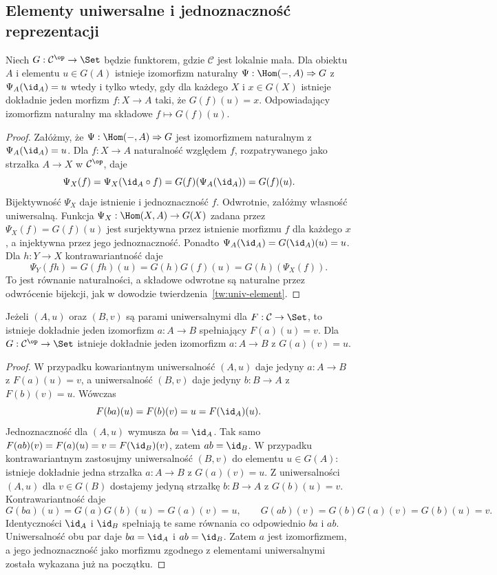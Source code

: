 \subsection{Elementy uniwersalne i jednoznaczność reprezentacji}

\begin{twierdzenie}\label{cat:thm:contra-univ-element}
Niech $G:\mathcal C^{\op}\to\Set$ będzie funktorem, gdzie $\mathcal C$ jest lokalnie mała. Dla obiektu $A$ i elementu $u\in G(A)$ istnieje izomorfizm naturalny $\Psi:\Hom(-,A)\Rightarrow G$ z $\Psi_A(\id_A)=u$ wtedy i tylko wtedy, gdy dla każdego $X$ i $x\in G(X)$ istnieje dokładnie jeden morfizm $f:X\to A$ taki, że $G(f)(u)=x$. Odpowiadający izomorfizm naturalny ma składowe $f\mapsto G(f)(u)$.
\end{twierdzenie}
\begin{proof}
Załóżmy, że $\Psi:\Hom(-,A)\Rightarrow G$ jest izomorfizmem naturalnym z $\Psi_A(\id_A)=u$. Dla $f:X\to A$ naturalność względem $f$, rozpatrywanego jako strzałka $A\to X$ w $\mathcal C^{\op}$, daje
\[
\Psi_X(f)=\Psi_X(\id_A\circ f)=G(f)(\Psi_A(\id_A))=G(f)(u).
\]
Bijektywność $\Psi_X$ daje istnienie i jednoznaczność $f$.
Odwrotnie, załóżmy własność uniwersalną. Funkcja
$\Psi_X:\Hom(X,A)\to G(X)$ zadana przez $\Psi_X(f)=G(f)(u)$
jest surjektywna przez istnienie morfizmu $f$ dla każdego $x$, a injektywna przez jego jednoznaczność. Ponadto $\Psi_A(\id_A)=G(\id_A)(u)=u$. Dla $h:Y\to X$ kontrawariantność daje
\[
\Psi_Y(fh)=G(fh)(u)=G(h)G(f)(u)=G(h)(\Psi_X(f)).
\]
To jest równanie naturalności, a składowe odwrotne są naturalne przez odwrócenie bijekcji, jak w dowodzie twierdzenia~\ref{tw:univ-element}.
\end{proof}

\begin{twierdzenie}\label{cat:thm:representing-unique}
Jeżeli $(A,u)$ oraz $(B,v)$ są parami uniwersalnymi dla $F:\mathcal C\to\Set$, to istnieje dokładnie jeden izomorfizm $a:A\to B$ spełniający $F(a)(u)=v$. Dla $G:\mathcal C^{\op}\to\Set$ istnieje dokładnie jeden izomorfizm $a:A\to B$ z $G(a)(v)=u$.
\end{twierdzenie}
\begin{proof}
W przypadku kowariantnym uniwersalność $(A,u)$ daje jedyny $a:A\to B$ z $F(a)(u)=v$, a uniwersalność $(B,v)$ daje jedyny $b:B\to A$ z $F(b)(v)=u$. Wówczas
\[
F(ba)(u)=F(b)(v)=u=F(\id_A)(u).
\]
Jednoznaczność dla $(A,u)$ wymusza $ba=\id_A$. Tak samo
$F(ab)(v)=F(a)(u)=v=F(\id_B)(v)$, zatem $ab=\id_B$.
W przypadku kontrawariantnym zastosujmy uniwersalność $(B,v)$ do elementu $u\in G(A)$: istnieje dokładnie jedna strzałka $a:A\to B$ z $G(a)(v)=u$. Z uniwersalności $(A,u)$ dla $v\in G(B)$ dostajemy jedyną strzałkę $b:B\to A$ z $G(b)(u)=v$. Kontrawariantność daje
\[
G(ba)(u)=G(a)G(b)(u)=G(a)(v)=u,
\qquad
G(ab)(v)=G(b)G(a)(v)=G(b)(u)=v.
\]
Identyczności $\id_A$ i $\id_B$ spełniają te same równania co odpowiednio $ba$ i $ab$. Uniwersalność obu par daje $ba=\id_A$ i $ab=\id_B$. Zatem $a$ jest izomorfizmem, a jego jednoznaczność jako morfizmu zgodnego z elementami uniwersalnymi została wykazana już na początku.
\end{proof}


